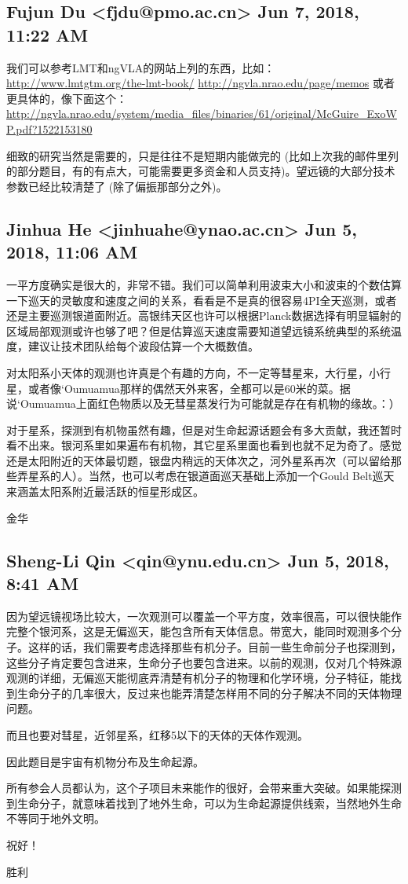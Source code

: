 \documentclass{article}
\newcommand\from[2]{\subsection{{#1} {#2}}}
\newcommand\said[1]{#1}
\begin{document}
\from{Fujun Du <fjdu@pmo.ac.cn>}
{Jun 7, 2018, 11:22 AM}

\said{
我们可以参考LMT和ngVLA的网站上列的东西，比如：
\url{http://www.lmtgtm.org/the-lmt-book/}
\url{http://ngvla.nrao.edu/page/memos}
或者更具体的，像下面这个：
\url{http://ngvla.nrao.edu/system/media_files/binaries/61/original/McGuire_ExoWP.pdf?1522153180}

细致的研究当然是需要的，只是往往不是短期内能做完的 (比如上次我的邮件里列的部分题目，有的有点大，可能需要更多资金和人员支持)。望远镜的大部分技术参数已经比较清楚了 (除了偏振那部分之外)。
}

\from{Jinhua He <jinhuahe@ynao.ac.cn>}
{Jun 5, 2018, 11:06 AM}
\said{
一平方度确实是很大的，非常不错。我们可以简单利用波束大小和波束的个数估算一下巡天的灵敏度和速度之间的关系，看看是不是真的很容易4PI全天巡测，或者还是主要巡测银道面附近。高银纬天区也许可以根据Planck数据选择有明显辐射的区域局部观测或许也够了吧？但是估算巡天速度需要知道望远镜系统典型的系统温度，建议让技术团队给每个波段估算一个大概数值。

对太阳系小天体的观测也许真是个有趣的方向，不一定等彗星来，大行星，小行星，或者像`Oumuamua那样的偶然天外来客，全都可以是60米的菜。据说`Oumuamua上面红色物质以及无彗星蒸发行为可能就是存在有机物的缘故。：）

对于星系，探测到有机物虽然有趣，但是对生命起源话题会有多大贡献，我还暂时看不出来。银河系里如果遍布有机物，其它星系里面也看到也就不足为奇了。感觉还是太阳附近的天体最切题，银盘内稍远的天体次之，河外星系再次（可以留给那些弄星系的人）。当然，也可以考虑在银道面巡天基础上添加一个Gould Belt巡天来涵盖太阳系附近最活跃的恒星形成区。

金华
}

\from{Sheng-Li Qin <qin@ynu.edu.cn>}
{Jun 5, 2018, 8:41 AM}
\said{ 因为望远镜视场比较大，一次观测可以覆盖一个平方度，效率很高，可以很快能作完整个银河系，这是无偏巡天，能包含所有天体信息。带宽大，能同时观测多个分子。这样的话，我们需要考虑选择那些有机分子。目前一些生命前分子也探测到，这些分子肯定要包含进来，生命分子也要包含进来。以前的观测，仅对几个特殊源观测的详细，无偏巡天能彻底弄清楚有机分子的物理和化学环境，分子特征，能找到生命分子的几率很大，反过来也能弄清楚怎样用不同的分子解决不同的天体物理问题。

而且也要对彗星，近邻星系，红移5以下的天体的天体作观测。

因此题目是宇宙有机物分布及生命起源。
          
所有参会人员都认为，这个子项目未来能作的很好，会带来重大突破。如果能探测到生命分子，就意味着找到了地外生命，可以为生命起源提供线索，当然地外生命不等同于地外文明。

祝好！

胜利
}
\end{document}
